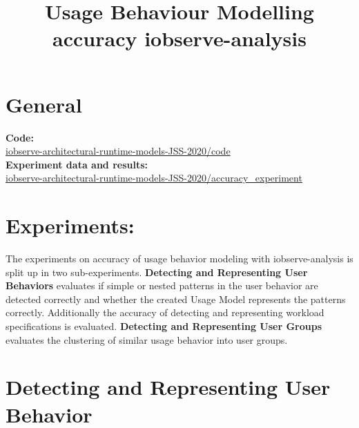 \documentclass[10pt,a4paper]{article}
\begin{document}
\title{Usage Behaviour Modelling\\accuracy iobserve-analysis}
\date{}
\maketitle

	\section{General}
	\textbf{Code:}\\
	\href{https://github.com/research-iobserve/iobserve-architectural-runtime-models-JSS-2020/tree/master/code}{iobserve-architectural-runtime-models-JSS-2020/code}\\
	\textbf{Experiment data and results:}\\ \href{https://github.com/research-iobserve/iobserve-architectural-runtime-models-JSS-2020/tree/master/accuracy_experiment}{iobserve-architectural-runtime-models-JSS-2020/accuracy\_experiment}
	
	\section{Experiments:}
	The experiments on accuracy of usage behavior modeling with iobserve-analysis is split up in two sub-experiments. \textbf{Detecting and Representing User Behaviors} evaluates if simple or nested patterns in the user behavior are detected correctly and whether the created Usage Model represents the patterns correctly. Additionally the accuracy of detecting and representing workload specifications is evaluated. \textbf{Detecting and Representing User Groups} evaluates the clustering of similar usage behavior into user groups.

	\section{Detecting and Representing User Behavior}
\end{document}
